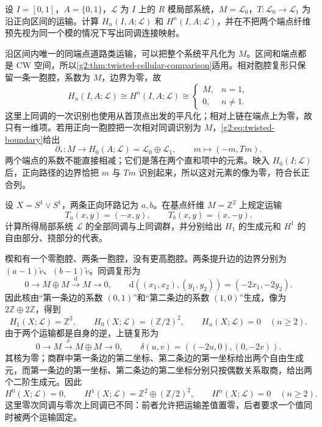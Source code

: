 \begin{exercise}\label{g2:ex:twisted-interval-pair}
	设 \(I=[0,1]\)，\(A=\{0,1\}\)，\(\mathcal L\) 为 \(I\) 上的 \(R\) 模局部系统，\(M=\mathcal L_0\)，\(T:\mathcal L_0\to\mathcal L_1\) 为沿正向区间的运输。计算 \(H_n(I,A;\mathcal L)\) 和 \(H^n(I,A;\mathcal L)\)，并在不把两个端点纤维预先视为同一个模的情况下写出同调连接映射。
\end{exercise}
\begin{solution}
	沿区间内唯一的同端点道路类运输，可以把整个系统平凡化为 \(M\)。区间和端点都是 CW 空间，所以\cref{g2:thm:twisted-cellular-comparison}适用。相对胞腔复形只保留一条一胞腔，系数为 \(M\)，边界为零，故
	\[
		H_n(I,A;\mathcal L)\cong H^n(I,A;\mathcal L)\cong
		\begin{cases}M,&n=1,\\0,&n\ne1.\end{cases}
	\]
	这里上同调的一次识别也使用从首顶点出发的平凡化；相对上链在端点上为零，故只有一维项。若用正向一胞腔把一次相对同调识别为 \(M\)，\eqref{g2:eq:twisted-boundary}给出
	\[
		\partial_*:M\longrightarrow H_0(A;\mathcal L)=\mathcal L_0\oplus\mathcal L_1,
		\qquad m\longmapsto(-m,Tm).
	\]
	两个端点的系数不能直接相减；它们是落在两个直和项中的元素。映入 \(H_0(I;\mathcal L)\) 后，正向路径的边界恰把 \(m\) 与 \(Tm\) 识别起来，所以这对元素的像为零，符合长正合列。
\end{solution}

\begin{exercise}\label{g2:ex:two-loop-local-matrices}
	设 \(X=S^1\vee S^1\)，两条正向环路记为 \(a,b\)。在基点纤维 \(M=\mathbb Z^2\) 上规定运输
	\[
		T_a(x,y)=(-x,y),\qquad T_b(x,y)=(x,-y).
	\]
	计算所得局部系统 \(\mathcal L\) 的全部同调与上同调群，并分别给出 \(H_1\) 的生成元和 \(H^1\) 的自由部分、挠部分的代表。
\end{exercise}
\begin{solution}
	楔和有一个零胞腔、两条一胞腔，没有更高胞腔。两条提升边的边界分别为 \((a-1)\widetilde v\)、\((b-1)\widetilde v\)。同调复形为
	\[
		0\longrightarrow M\oplus M\xrightarrow{\mathrm d}M\longrightarrow0,
		\qquad \mathrm d((x_1,x_2),(y_1,y_2))=(-2x_1,-2y_2).
	\]
	因此核由“第一条边的系数 \((0,1)\)”和“第二条边的系数 \((1,0)\)”生成，像为 \(2\mathbb Z\oplus2\mathbb Z\)，得到
	\[
		H_1(X;\mathcal L)=\mathbb Z^2,\qquad
		H_0(X;\mathcal L)=(\mathbb Z/2)^2,
		\qquad H_n(X;\mathcal L)=0\quad(n\ge2).
	\]
	由于两个运输都是自身的逆，上链复形为
	\[
		0\longrightarrow M\xrightarrow{\delta}M\oplus M\longrightarrow0,
		\qquad\delta(u,v)=((-2u,0),(0,-2v)).
	\]
	其核为零；商群中第一条边的第二坐标、第二条边的第一坐标给出两个自由生成元，而第一条边的第一坐标、第二条边的第二坐标分别只按偶数关系取商，给出两个二阶生成元。因此
	\[
		H^0(X;\mathcal L)=0,\qquad
		H^1(X;\mathcal L)=\mathbb Z^2\oplus(\mathbb Z/2)^2,
		\qquad H^n(X;\mathcal L)=0\quad(n\ge2).
	\]
	这里零次同调与零次上同调已不同：前者允许把运输差值置零，后者要求一个值同时被两个运输固定。
\end{solution}

